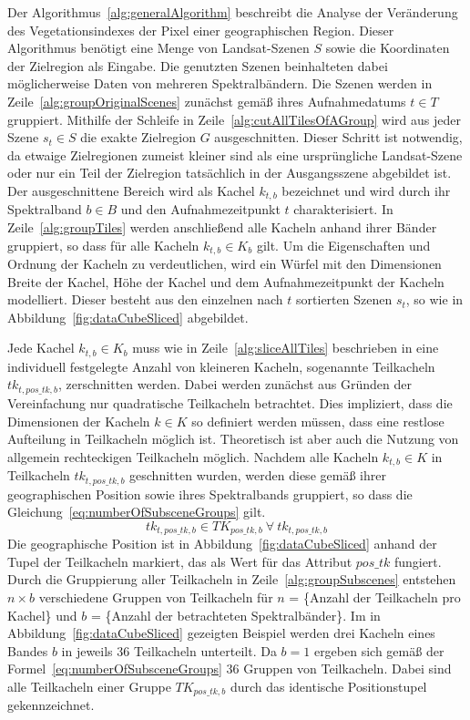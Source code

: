 Der Algorithmus~\ref{alg:generalAlgorithm} beschreibt die Analyse der Veränderung des Vegetationsindexes der Pixel einer geographischen Region. Dieser Algorithmus benötigt eine Menge von Landsat-Szenen $S$ sowie die Koordinaten der Zielregion als Eingabe. Die genutzten Szenen beinhalteten dabei möglicherweise Daten von mehreren Spektralbändern. Die Szenen werden in Zeile~\ref{alg:groupOriginalScenes} zunächst gemäß ihres Aufnahmedatums $t \in T$ gruppiert. Mithilfe der Schleife in Zeile~\ref{alg:cutAllTilesOfAGroup} wird aus jeder Szene $s_t \in S$ die exakte Zielregion $G$ ausgeschnitten. Dieser Schritt ist notwendig, da etwaige Zielregionen zumeist kleiner sind als eine ursprüngliche Landsat-Szene oder nur ein Teil der Zielregion tatsächlich in der Ausgangsszene abgebildet ist. Der ausgeschnittene Bereich wird als Kachel $k_{t, b}$ bezeichnet und wird durch ihr Spektralband $b \in B$ und den Aufnahmezeitpunkt $t$ charakterisiert. In Zeile~\ref{alg:groupTiles} werden anschließend alle Kacheln anhand ihrer Bänder gruppiert, so dass für alle Kacheln $k_{t, b} \in K_{b}$ gilt. Um die Eigenschaften und Ordnung der Kacheln zu verdeutlichen, wird ein Würfel mit den Dimensionen Breite der Kachel, Höhe der Kachel und dem Aufnahmezeitpunkt der Kacheln modelliert. Dieser besteht aus den einzelnen nach $t$ sortierten Szenen $s_t$, so wie in Abbildung~\ref{fig:dataCubeSliced} abgebildet. 

Jede Kachel $k_{t, b} \in K_{b}$ muss wie in Zeile~\ref{alg:sliceAllTiles} beschrieben in eine individuell festgelegte Anzahl von kleineren Kacheln, sogenannte Teilkacheln $tk_{t, pos\_tk, b}$, zerschnitten werden. Dabei werden zunächst aus Gründen der Vereinfachung nur quadratische Teilkacheln betrachtet. Dies impliziert, dass die Dimensionen der Kacheln $k \in K$ so definiert werden müssen, dass eine restlose Aufteilung in Teilkacheln möglich ist. Theoretisch ist aber auch die Nutzung von allgemein rechteckigen Teilkacheln möglich. Nachdem alle Kacheln $k_{t, b} \in K$ in Teilkacheln $tk_{t, pos\_tk, b}$ geschnitten wurden, werden diese gemäß ihrer geographischen Position sowie ihres Spektralbands gruppiert, so dass die Gleichung~\ref{eq:numberOfSubsceneGroups} gilt.
%
\begin{equation} \label{eq:numberOfSubsceneGroups}
tk_{t, pos\_tk, b} \in TK_{pos\_tk, b}\ \forall\ tk_{t, pos\_tk, b}
\end{equation}
%
Die geographische Position ist in Abbildung~\ref{fig:dataCubeSliced} anhand der Tupel der Teilkacheln markiert, das als Wert für das Attribut $pos\_tk$ fungiert. Durch die Gruppierung aller Teilkacheln in Zeile~\ref{alg:groupSubscenes} entstehen $n \times b$  verschiedene Gruppen von Teilkacheln für $n$ = \{Anzahl der Teilkacheln pro Kachel\} und $b$ = \{Anzahl der betrachteten Spektralbänder\}. Im in Abbildung~\ref{fig:dataCubeSliced} gezeigten Beispiel werden drei Kacheln eines Bandes $b$ in jeweils 36 Teilkacheln unterteilt. Da $b=1$ ergeben sich gemäß der Formel~\ref{eq:numberOfSubsceneGroups} 36 Gruppen von Teilkacheln. Dabei sind alle Teilkacheln einer Gruppe $TK_{pos\_tk, b}$ durch das identische Positionstupel gekennzeichnet.

